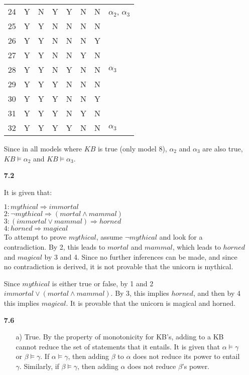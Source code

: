 \documentclass{article}
\begin{document}
\begin{enumerate}
\begin{tabular}{ c c c c c c c l }
24 & Y & N & Y & Y & N & N & $\alpha_2$, $\alpha_3$ \\
25 & Y & Y & N & N & N & N & \\
26 & Y & Y & N & N & N & Y & \\
27 & Y & Y & N & N & Y & N & \\
28 & Y & Y & N & Y & N & N & $\alpha_3$ \\
29 & Y & Y & Y & N & N & N & \\
30 & Y & Y & Y & N & N & Y & \\
31 & Y & Y & Y & N & Y & N & \\
32 & Y & Y & Y & Y & N & N & $\alpha_3$ \\

\end{tabular}

Since in all models where $KB$ is true (only model 8), $\alpha_2$
and $\alpha_3$ are also true, $KB \models \alpha_2$ and $KB \models \alpha_3$.

\item[\textbf{7.2}]

It is given that:

$1: mythical \Rightarrow immortal$\\
$2: \neg mythical \Rightarrow (mortal \wedge mammal)$\\
$3: (immortal \vee mammal) \Rightarrow horned $\\
$4: horned \Rightarrow magical$\\

To attempt to prove $mythical$, assume $\neg mythical$ and look for a
contradiction. By 2, this leads to $mortal$ and $mammal$, which leads to
$horned$ and $magical$ by 3 and 4. Since no further inferences can be made, and
since no contradiction is derived, it is not provable that the unicorn is
mythical.

Since $mythical$ is either true or false, by 1 and 2 $immortal \vee (mortal
\wedge mammal)$. By 3, this implies $horned$, and then by 4 this implies
$magical$. It is provable that the unicorn is magical and horned.

\item[\textbf{7.6}]

\begin{enumerate}
\item[a)]
True. By the property of monotonicity for KB's, adding to a KB cannot
reduce the set of statements that it entails. It is given that $\alpha \models
\gamma$ or $\beta \models \gamma$. If $\alpha \models \gamma$, then adding
$\beta$ to $\alpha$ does not reduce its power to entail $\gamma$. Similarly, if
$\beta \models \gamma$, then adding $\alpha$ does not reduce $\beta$'s power.


\end{enumerate}
\end{enumerate}
\end{document}
